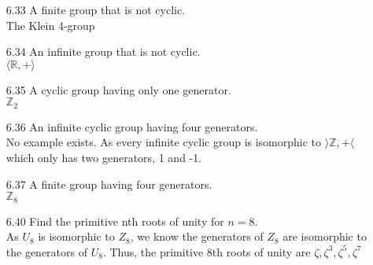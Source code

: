 \documentclass[12pt]{article}
\newcommand{\Z}{\mathds{Z}}
\newcommand{\R}{\mathbb{R}}
\begin{document}
\begin{enumerate}
	\item[6.33] A finite group that is not cyclic.\\
		The Klein 4-group
	\item[6.34] An infinite group that is not cyclic.\\
		$ \langle \R , + \rangle $
	\item[6.35] A cyclic group having only one generator.\\
		$ \Z_2 $
	
	\item[6.36] An infinite cyclic group having four generators.\\
		No example exists. As every infinite cyclic group is isomorphic to $ \rangle \Z,+\langle $ which only has two generators, 1 and -1.
	
	\item[6.37] A finite group having four generators.\\
	$ \Z_8 $
	\item[6.40] Find the primitive nth roots of unity for $n = 8$.\\
	 As $U_8$ is isomorphic to $Z_8$, we know the generators of $Z_8$ are isomorphic to the generators of $U_8$. Thus, the primitive 8th roots of unity are $\zeta, \zeta^3, \zeta^5, \zeta^7$
	

\end{enumerate}
\end{document}

